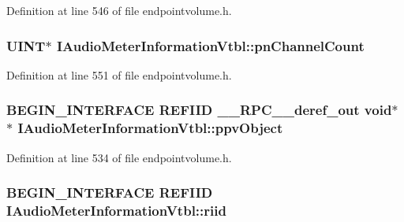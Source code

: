 Definition at line 546 of file endpointvolume.\+h.

\subsubsection[{\texorpdfstring{pn\+Channel\+Count}{pnChannelCount}}]{ {\bf U\+I\+NT}$\ast$ I\+Audio\+Meter\+Information\+Vtbl\+::pn\+Channel\+Count}\hypertarget{struct_i_audio_meter_information_vtbl_a4d623a4a4046b0ed5d736fec9f5bdfdb}{}\label{struct_i_audio_meter_information_vtbl_a4d623a4a4046b0ed5d736fec9f5bdfdb}


Definition at line 551 of file endpointvolume.\+h.

\subsubsection[{\texorpdfstring{ppv\+Object}{ppvObject}}]{\setlength{\rightskip}{0pt plus 5cm}B\+E\+G\+I\+N\+\_\+\+I\+N\+T\+E\+R\+F\+A\+CE {\bf R\+E\+F\+I\+ID} {\bf \+\_\+\+\_\+\+R\+P\+C\+\_\+\+\_\+deref\+\_\+out} {\bf void}$\ast$$\ast$ I\+Audio\+Meter\+Information\+Vtbl\+::ppv\+Object}\hypertarget{struct_i_audio_meter_information_vtbl_a2c3648ad44fc0fd48fe088f68694b661}{}\label{struct_i_audio_meter_information_vtbl_a2c3648ad44fc0fd48fe088f68694b661}


Definition at line 534 of file endpointvolume.\+h.

\subsubsection[{\texorpdfstring{riid}{riid}}]{\setlength{\rightskip}{0pt plus 5cm}B\+E\+G\+I\+N\+\_\+\+I\+N\+T\+E\+R\+F\+A\+CE {\bf R\+E\+F\+I\+ID} I\+Audio\+Meter\+Information\+Vtbl\+::riid}\hypertarget{struct_i_audio_meter_information_vtbl_a0a5da77096669d539d18a94855ff3bc1}{}\label{struct_i_audio_meter_information_vtbl_a0a5da77096669d539d18a94855ff3bc1}


